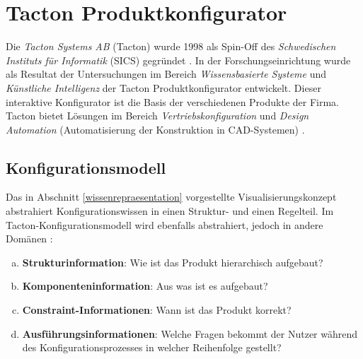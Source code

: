 \documentclass[11pt, a4paper, titlepage, listof=totoc, bibliography=totoc, index=totoc, twoside, openright, headings=normal, draft]{scrreprt}
\begin{document}
\section{Tacton Produktkonfigurator}

Die \emph{Tacton Systems AB} (Tacton) wurde 1998 als Spin-Off des \emph{Schwedischen Instituts für Informatik} (SICS) gegründet \citep{tactonProductOverview}. In der Forschungseinrichtung wurde als Resultat der Untersuchungen im Bereich \emph{Wissensbasierte Systeme} und \emph{Künstliche Intelligenz} der Tacton Produktkonfigurator entwickelt. Dieser interaktive Konfigurator ist die Basis der verschiedenen Produkte der Firma. Tacton bietet Lösungen im Bereich \emph{Vertriebskonfiguration} und \emph{Design Automation} (Automatisierung der Konstruktion in CAD-Systemen) \citep{tactonAbout}.

\subsection{Konfigurationsmodell}
\label{tactonKonfigurationsmodell}
Das in Abschnitt \ref{wissenrepraesentation} vorgestellte Visualisierungskonzept abstrahiert Konfigurationswissen in einen Struktur- und einen Regelteil. Im Tacton-Konfigurationsmodell wird ebenfalls abstrahiert, jedoch in andere Domänen \citep{tactonModeling}:

\begin{enumerate}[(a)]
\item \label{strukturinformation} \textbf{Strukturinformation}: Wie ist das Produkt hierarchisch aufgebaut?
\item \label{komponenteninformation} \textbf{Komponenteninformation}: Aus was ist es aufgebaut?
\item \label{constraintinformationen} \textbf{Constraint-Informationen}: Wann ist das Produkt korrekt?
\item \label{ausfuehrungsinformationen} \textbf{Ausführungsinformationen}: Welche Fragen bekommt der Nutzer während des Konfigurationsprozesses in welcher Reihenfolge gestellt?
\end{enumerate}
\end{document}
